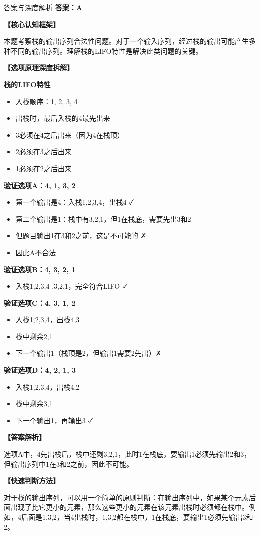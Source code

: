 \documentclass[12pt, a4paper]{article}
\newenvironment{bluebox}{\begin{framed}\begin{minipage}{\linewidth}}{\end{minipage}\end{framed}}
\begin{document}
\begin{bluebox}{答案与深度解析}
	\textbf{答案：A}

	\textbf{【核心认知框架】}

	本题考察栈的输出序列合法性问题。对于一个输入序列，经过栈的输出可能产生多种不同的输出序列。理解栈的LIFO特性是解决此类问题的关键。

	\textbf{【选项原理深度拆解】}

	\item \textbf{栈的LIFO特性}
	\begin{itemize}
		\item 入栈顺序：1, 2, 3, 4
		\item 出栈时，最后入栈的4最先出来
		\item 3必须在4之后出来（因为4在栈顶）
		\item 2必须在3之后出来
		\item 1必须在2之后出来
	\end{itemize}

	\item \textbf{验证选项A：4, 1, 3, 2}
	\begin{itemize}
		\item 第一个输出是4：入栈1,2,3,4，出栈4 ✓
		\item 第二个输出是1：栈中有3,2,1，但1在栈底，需要先出3和2
		\item 但题目输出1在3和2之前，这是不可能的 ✗
		\item 因此A不合法
	\end{itemize}

	\item \textbf{验证选项B：4, 3, 2, 1}
	\begin{itemize}
		\item 入栈1,2,3,4
		      ,3,2,1，完全符合LIFO ✓
	\end{itemize}

	\item \textbf{验证选项C：4, 3, 1, 2}
	\begin{itemize}
		\item 入栈1,2,3,4，出栈4,3
		\item 栈中剩余2,1
		\item 下一个输出1（栈顶是2，但输出1需要2先出）✗
	\end{itemize}

	\item \textbf{验证选项D：4, 2, 1, 3}
	\begin{itemize}
		\item 入栈1,2,3,4，出栈4,2
		\item 栈中剩余3,1
		\item 下一个输出1，再输出3 ✓
	\end{itemize}

	\textbf{【答案解析】}

	选项A中，4先出栈后，栈中还剩3,2,1，此时1在栈底，要输出1必须先输出2和3，但输出序列中1在3和2之前，因此不可能。

	\textbf{【快速判断方法】}

	对于栈的输出序列，可以用一个简单的原则判断：在输出序列中，如果某个元素后面出现了比它更小的元素，那么这些更小的元素在该元素出栈时必须都在栈中。例如，4后面是1,3,2，当4出栈时，1,3,2都在栈中，1在栈底，要输出1必须先输出3和2。
\end{bluebox}
\end{document}
